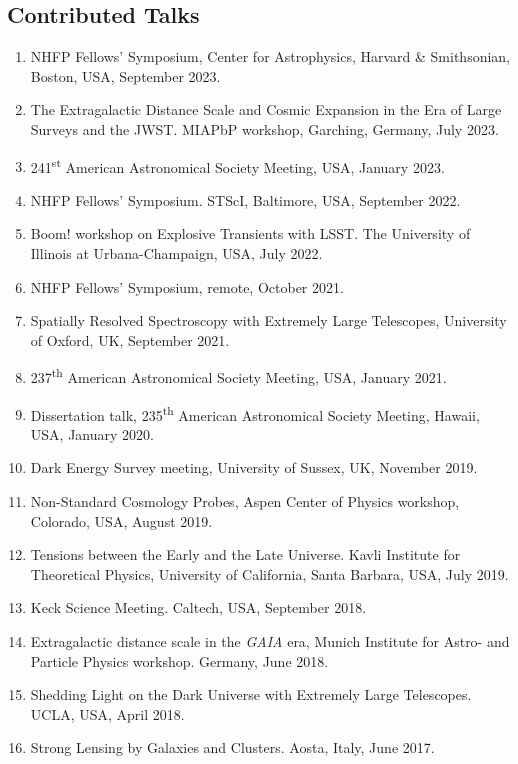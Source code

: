 \documentclass[margin, line]{res}
\begin{document}
\begin{resume}
\section{\sc Contributed Talks}
\begin{enumerate}
	\item NHFP Fellows' Symposium, Center for Astrophysics, Harvard \& Smithsonian, Boston, USA, September 2023.
	\item The Extragalactic Distance Scale and Cosmic Expansion in the Era of Large Surveys and the JWST. MIAPbP workshop, Garching, Germany, July 2023. 
	\item 241\textsuperscript{st} American Astronomical Society Meeting, USA, January 2023.
	\item NHFP Fellows' Symposium. STScI, Baltimore, USA, September 2022.
	\item Boom! workshop on Explosive Transients with LSST. The University of Illinois at Urbana-Champaign, USA, July 2022.
	\item NHFP Fellows' Symposium, remote, October 2021.
	\item Spatially Resolved Spectroscopy with Extremely Large Telescopes, University of Oxford, UK, September 2021. %
	\item 237\textsuperscript{th} American Astronomical Society Meeting, USA, January 2021. %
	\item Dissertation talk, 235\textsuperscript{th} American Astronomical Society Meeting, Hawaii, USA, January 2020.
	\item Dark Energy Survey meeting, University of Sussex, UK, November 2019. %
	\item Non-Standard Cosmology Probes, Aspen Center of Physics workshop, Colorado, USA, August 2019.
	\item Tensions between the Early and the Late Universe. Kavli Institute for Theoretical Physics, University of California, Santa Barbara, USA, July 2019.
	\item Keck Science Meeting. Caltech, USA, September 2018.
	\item Extragalactic distance scale in the \textit{GAIA} era, Munich Institute for Astro- and Particle Physics workshop. Germany, June 2018.
	\item Shedding Light on the Dark Universe with Extremely Large Telescopes. UCLA, USA, April 2018.
	\item Strong Lensing by Galaxies and Clusters. Aosta, Italy, June 2017.
\end{enumerate}



\end{resume}
\end{document}
